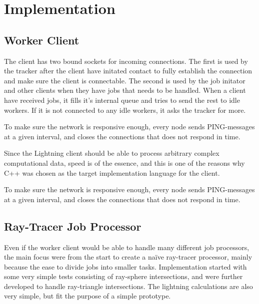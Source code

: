\chapter{Implementation}


\section{Worker Client}
The client has two bound sockets for incoming connections. The first is used by the tracker after the client have initated contact to fully establish the connection and make sure the client is connectable.
The second is used by the job initator and other clients when they have jobs that needs to be handled.
When a client have received jobs, it fills it's internal queue and tries to send the rest to idle workers. 
If it is not connected to any idle workers, it asks the tracker for more.

To make sure the network is responsive enough, every node sends PING-messages at a given interval, and closes the connections that does not respond in time.

Since the Lightning client should be able to process arbitrary complex computational data, speed is of the essence, and this is one of the reasons why C++ was chosen as the target implementation language for the client.

To make sure the network is responsive enough, every node sends PING-messages at a given interval, and closes the connections that does not respond in time.

\section{Ray-Tracer Job Processor}
Even if the worker client would be able to handle many different job processors, the main focus were from the start to create a naïve ray-tracer processor, mainly because the ease to divide jobs into smaller tasks. Implementation started with some very simple tests consisting of ray-sphere intersections, and were further developed to handle ray-triangle intersections. The lightning calculations are also very simple, but fit the purpose of a simple prototype.

